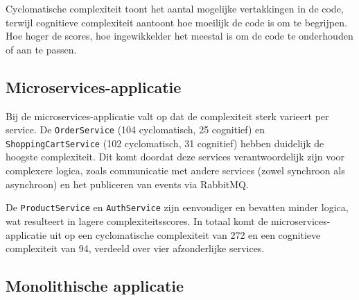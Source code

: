 Cyclomatische complexiteit toont het aantal mogelijke vertakkingen in de code, terwijl cognitieve complexiteit aantoont hoe moeilijk de code is om te begrijpen. Hoe hoger de scores, hoe ingewikkelder het meestal is om de code te onderhouden of aan te passen.

\begin{table}[H]
	\centering
	\caption{Complexiteitsanalyse per service}
\end{table}

\subsection{Microservices-applicatie}

Bij de microservices-applicatie valt op dat de complexiteit sterk varieert per service. De \texttt{OrderService} (104 cyclomatisch, 25 cognitief) en \texttt{ShoppingCartService} (102 cyclomatisch, 31 cognitief) hebben duidelijk de hoogste complexiteit. Dit komt doordat deze services verantwoordelijk zijn voor complexere logica, zoals communicatie met andere services (zowel synchroon als asynchroon) en het publiceren van events via RabbitMQ.\newline

De \texttt{ProductService} en \texttt{AuthService} zijn eenvoudiger en bevatten minder logica, wat resulteert in lagere complexiteitsscores. In totaal komt de microservices-applicatie uit op een cyclomatische complexiteit van 272 en een cognitieve complexiteit van 94, verdeeld over vier afzonderlijke services.

\subsection{Monolithische applicatie}

